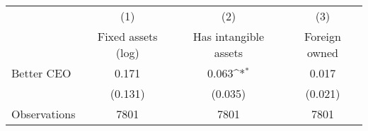 {
\def\sym#1{\ifmmode^{#1}\else\(^{#1}\)\fi}
\begin{tabular}{l*{3}{c}}
\hline\hline
                    &\multicolumn{1}{c}{(1)}&\multicolumn{1}{c}{(2)}&\multicolumn{1}{c}{(3)}\\
                    &\multicolumn{1}{c}{Fixed assets (log)}&\multicolumn{1}{c}{Has intangible assets}&\multicolumn{1}{c}{Foreign owned}\\
\hline
Better CEO          &       0.171         &       0.063\sym{*}  &       0.017         \\
                    &     (0.131)         &     (0.035)         &     (0.021)         \\
\hline
Observations        &        7801         &        7801         &        7801         \\
\hline\hline
\end{tabular}
}
